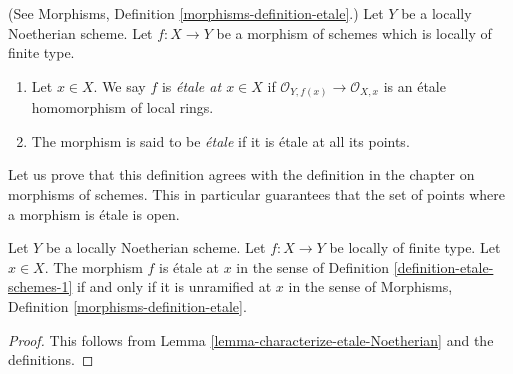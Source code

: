 \begin{definition}
\label{definition-etale-schemes-1}
(See Morphisms, Definition \ref{morphisms-definition-etale}.)
Let $Y$ be a locally Noetherian scheme.
Let $f : X \to Y$ be a morphism of schemes which is locally of finite type.
\begin{enumerate}
\item Let $x \in X$. We say $f$ is {\it \'etale at $x \in X$} if
$\mathcal{O}_{Y, f(x)} \to \mathcal{O}_{X, x}$ is an
\'etale homomorphism of local rings.
\item The morphism is said to be {\it \'etale} if it is \'etale at all its
points.
\end{enumerate}
\end{definition}

\noindent
Let us prove that this definition agrees with the definition in the
chapter on morphisms of schemes. This in particular guarantees that the
set of points where a morphism is \'etale is open.

\begin{lemma}
\label{lemma-etale-definition}
Let $Y$ be a locally Noetherian scheme.
Let $f : X \to Y$ be locally of finite type.
Let $x \in X$. The morphism $f$ is \'etale at $x$ in
the sense of Definition \ref{definition-etale-schemes-1}
if and only if it is unramified at $x$ in
the sense of Morphisms, Definition \ref{morphisms-definition-etale}.
\end{lemma}

\begin{proof}
This follows from Lemma \ref{lemma-characterize-etale-Noetherian}
and the definitions.
\end{proof}

